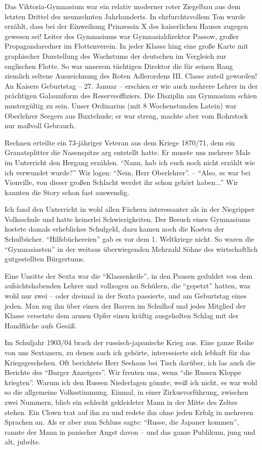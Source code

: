 \documentclass[a5paper,pagesize,10pt,twoside=true]{scrbook}
\begin{document}
Das Viktoria-Gymnasium war ein relativ moderner roter Ziegelbau aus dem letzten Drittel des neunzehnten Jahrhunderts. In ehrfurchtsvollem Ton wurde erzählt, dass bei der Einweihung Prinzessin X des kaiserlichen Hauses zugegen gewesen sei! Leiter des Gymnasiums war Gymnasialdirektor Passow, großer Propagandaredner im Flottenverein. In jeder Klasse hing eine große Karte mit graphischer Darstellung des Wachstums der deutschen im Vergleich zur englischen Flotte. So war unserem tüchtigen Direktor die für seinen Rang ziemlich seltene Auszeichnung des Roten Adlerordens III. Classe zuteil geworden! An Kaisers Geburtstag -- 27. Januar -- erschien er wie auch mehrere Lehrer in der prächtigen Galauniform des Reserveoffiziers. Die Disziplin am Gymnasium schien mustergültig zu sein. Unser Ordinarius (mit 8 Wochenstunden Latein) war Oberlehrer Seegers aus Buxtehude; er war streng, machte aber vom Rohrstock nur maßvoll Gebrauch.

Rechnen erteilte ein 73-jähriger Veteran aus dem Kriege 1870/71, dem ein Granatsplitter die Nasenspitze arg entstellt hatte. Er musste uns mehrere Male im Unterricht den Hergang erzählen. \enquote{Nanu, hab ich euch noch nicht erzählt wie ich verwundet wurde?} Wir logen: \enquote{Nein, Herr Oberlehrer}. -- \enquote{Also, es war bei Vionville, von dieser großen Schlacht werdet ihr schon gehört haben...} Wir kannten die Story schon fast auswendig.

Ich fand den Unterricht in wohl allen Fächern interessanter als in der Niegripper Volksschule und hatte keinerlei Schwierigkeiten. Der Besuch eines Gymnasiums kostete damals erhebliches Schulgeld, dazu kamen noch die Kosten der Schulbücher. \enquote{Hilfsbüchereien} gab es vor dem 1. Weltkriege nicht. So waren die \enquote{Gymnasiasten} in der weitaus überwiegenden Mehrzahl Söhne des wirtschaftlich gutgestellten Bürgertums.

Eine Unsitte der Sexta war die \enquote{Klassenkeile}, in den Pausen geduldet von dem aufsichtshabenden Lehrer und vollzogen an Schülern, die \enquote{gepetzt} hatten, was wohl nur zwei -- oder dreimal in der Sexta passierte, und am Geburtstag eines jeden. Man zog ihn über einen der Barren im Schulhof und jedes Mitglied der Klasse versetzte dem armen Opfer einen kräftig ausgeholten Schlag mit der Handfläche aufs Gesäß.

Im Schuljahr 1903/04 brach der russisch-japanische Krieg aus. Eine ganze Reihe von uns Sextanern, zu denen auch ich gehörte, interessierte sich lebhaft für das Kriegsgeschehen. Oft berichtete Herr Seehaus bei Tisch darüber, ich las auch die Berichte des \enquote{Burger Anzeigers}. Wir freuten uns, wenn \enquote{die Russen Kloppe kriegten}. Warum ich den Russen Niederlagen gönnte, weiß ich nicht, es war wohl so die allgemeine Volksstimmung. Einmal, in einer Zirkusvorführung, zwischen zwei Nummern, blieb ein schlecht gekleideter Mann in der Mitte des Zeltes stehen. Ein Clown trat auf ihn zu und redete ihn ohne jeden Erfolg in mehreren Sprachen an. Als er aber zum Schluss sagte: \enquote{Russe, die Japaner kommen}, rannte der Mann in panischer Angst davon -- und das ganze Publikum, jung und alt, jubelte.
\end{document}
